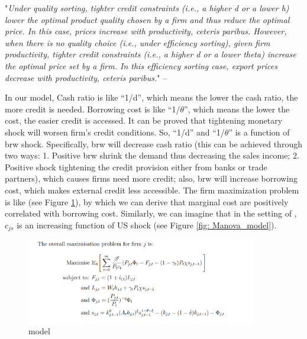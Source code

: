 \documentclass[12pt]{article}
\begin{document}
"\textit{Under quality sorting, tighter credit constraints (i.e., a higher d or a lower h) lower the optimal product quality chosen by a firm and thus reduce the optimal price. In this case, prices increase with productivity, ceteris paribus. However, when there is no quality choice (i.e., under efficiency sorting), given firm productivity, tighter credit constraints (i.e., a higher d or a lower theta) increase the optimal price set by a firm. In this efficiency sorting case, export prices decrease with productivity, ceteris paribus.}" -- \cite{fan2015credit}
 
In our model, Cash ratio is like “1/d”, which means the lower the cash ratio, the more credit is needed. Borrowing cost is like “1/$\theta$”, which means the lower the cost, the easier credit is accessed. It can be proved that tightening monetary shock will worsen firm’s credit conditions. So, “1/d” and  “1/$\theta$” is a function of brw shock. Specifically, brw will decrease cash ratio (this can be achieved through two ways: 1. Positive brw shrink the demand thus decreasing the sales income; 2. Positive shock tightening the credit provision either from banks or trade partners), which causes firms need more credit; also, brw will increase borrowing cost, which makes external credit less accessible. The firm maximization problem is like \cite{corugedo2011understanding} (see Figure \ref{fig: Corugedo_model}), by which we can derive that marginal cost are positively correlated with borrowing cost. Similarly, we can imagine that in the setting of \cite{manova2013credit}, $c_{js}$ is an increasing function of US shock (see Figure \ref{fig: Manova_model}). 


\begin{figure}
     \centering
         \includegraphics[width=0.9\textwidth]{latex/2023.10/Picture/Corugedo_model.png}
         \caption{\cite{corugedo2011understanding} model}
         \label{fig: Corugedo_model}
\end{figure}
\end{document}
